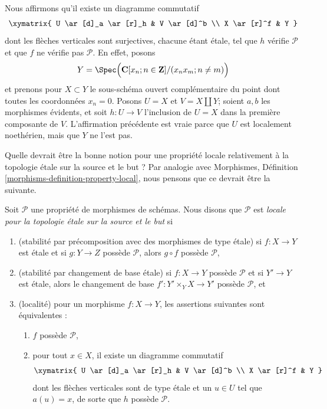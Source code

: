 \begin{example}
\medskip\noindent
Nous affirmons qu'il existe un diagramme commutatif
$$
\xymatrix{
U \ar[d]_a \ar[r]_h & V \ar[d]^b \\
X \ar[r]^f & Y
}
$$
dont les flèches verticales sont surjectives, chacune étant \'etale, tel que $h$ vérifie
$\mathcal{P}$ et que $f$ ne vérifie pas $\mathcal{P}$. En effet, posons
$$
Y =
\Spec\Big(
\mathbf{C}[x_n; n \in \mathbf{Z}]/(x_n x_m; n \not = m)
\Big)
$$
et prenons pour $X \subset Y$ le sous-schéma ouvert complémentaire du point
dont toutes les coordonnées $x_n = 0$. Posons $U = X$ et
$V = X \amalg Y$; soient $a, b$ les morphismes évidents, et soit
$h : U \to V$ l'inclusion de $U = X$ dans la première composante de $V$.
L'affirmation précédente est vraie parce que $U$ est localement noethérien,
mais que $Y$ ne l'est pas.
\end{example}

\noindent
Quelle devrait être la bonne notion pour une propriété locale relativement à
la topologie \'etale sur la source et le but ? Par analogie avec
Morphismes, Définition \ref{morphisms-definition-property-local}, nous pensons
que ce devrait être la suivante.

\begin{definition}
\label{definition-local-source-target}
Soit $\mathcal{P}$ une propriété de morphismes de schémas.
Nous disons que $\mathcal{P}$ est {\it locale pour la topologie \'etale sur
la source et le but} si
\begin{enumerate}
\item (stabilité par précomposition avec des morphismes de type \'etale)
si $f : X \to Y$ est \'etale et si $g : Y \to Z$ possède $\mathcal{P}$,
alors $g \circ f$ possède $\mathcal{P}$,
\item (stabilité par changement de base \'etale)
si $f : X \to Y$ possède $\mathcal{P}$ et si $Y' \to Y$ est \'etale, alors
le changement de base $f' : Y' \times_Y X \to Y'$ possède $\mathcal{P}$, et
\item (localité) pour un morphisme $f : X \to Y$, les assertions suivantes
sont équivalentes :
\begin{enumerate}
\item $f$ possède $\mathcal{P}$,
\item pour tout $x \in X$, il existe un diagramme commutatif
$$
\xymatrix{
U \ar[d]_a \ar[r]_h & V \ar[d]^b \\
X \ar[r]^f & Y
}
$$
dont les flèches verticales sont de type \'etale et un $u \in U$ tel que
$a(u) = x$, de sorte que $h$ possède $\mathcal{P}$.
\end{enumerate}
\end{enumerate}
\end{definition}

